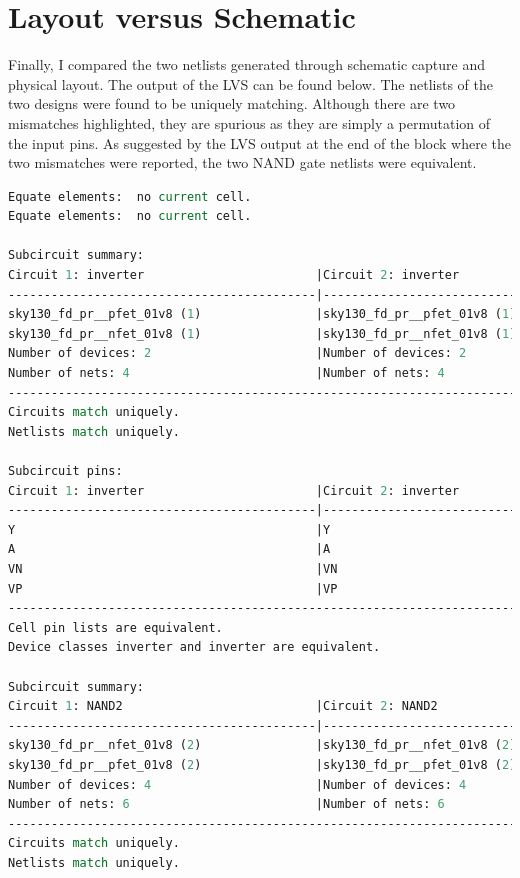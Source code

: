 \documentclass[11pt]{article}
\begin{document}
    \FloatBarrier
    \section{Layout versus Schematic}
    Finally, I compared the two netlists generated through schematic capture and physical layout. The output of the LVS can be found below. The netlists of the two designs were found to be uniquely matching. Although there are two mismatches highlighted, they are spurious as they are simply a permutation of the input pins. As suggested by the LVS output at the end of the block where the two mismatches were reported, the two NAND gate netlists were equivalent.
    \begin{lstlisting}[language=tcl, caption=Netgen comparison between Xschem and Magic AND2]
Equate elements:  no current cell.
Equate elements:  no current cell.

Subcircuit summary:
Circuit 1: inverter                        |Circuit 2: inverter                        
-------------------------------------------|----------------------------
sky130_fd_pr__pfet_01v8 (1)                |sky130_fd_pr__pfet_01v8 (1)                
sky130_fd_pr__nfet_01v8 (1)                |sky130_fd_pr__nfet_01v8 (1)                
Number of devices: 2                       |Number of devices: 2                       
Number of nets: 4                          |Number of nets: 4                          
------------------------------------------------------------------------
Circuits match uniquely.
Netlists match uniquely.

Subcircuit pins:
Circuit 1: inverter                        |Circuit 2: inverter                        
-------------------------------------------|----------------------------
Y                                          |Y                                          
A                                          |A                                          
VN                                         |VN                                         
VP                                         |VP                                         
------------------------------------------------------------------------
Cell pin lists are equivalent.
Device classes inverter and inverter are equivalent.

Subcircuit summary:
Circuit 1: NAND2                           |Circuit 2: NAND2                           
-------------------------------------------|----------------------------
sky130_fd_pr__nfet_01v8 (2)                |sky130_fd_pr__nfet_01v8 (2)                
sky130_fd_pr__pfet_01v8 (2)                |sky130_fd_pr__pfet_01v8 (2)                
Number of devices: 4                       |Number of devices: 4                       
Number of nets: 6                          |Number of nets: 6                          
------------------------------------------------------------------------
Circuits match uniquely.
Netlists match uniquely.


\end{lstlisting}
\end{document}
